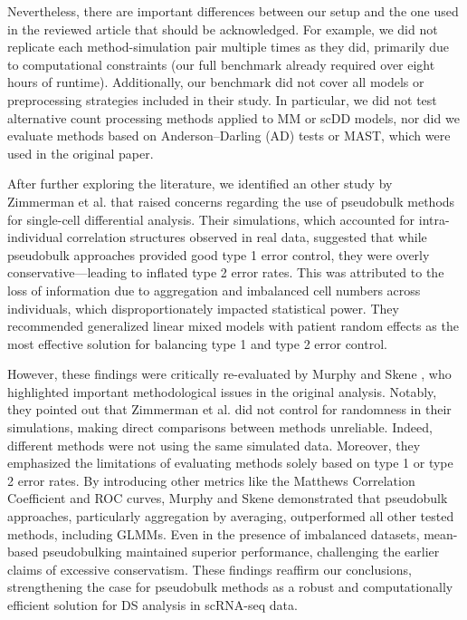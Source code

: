 \documentclass[a4paper, 11pt, twocolumn]{article}
\begin{document}
\begin{multicols}{2}
Nevertheless, there are important differences between our setup and the one used in the reviewed article that should be acknowledged. For example, we did not replicate each method-simulation pair multiple times as they did, primarily due to computational constraints (our full benchmark already required over eight hours of runtime). Additionally, our benchmark did not cover all models or preprocessing strategies included in their study. In particular, we did not test alternative count processing methods applied to MM or scDD models, nor did we evaluate methods based on Anderson–Darling (AD) tests or MAST, which were used in the original paper.

After further exploring the literature, we identified an other study by Zimmerman et al. \citep{zimmerman2021practical} that raised concerns regarding the use of pseudobulk methods for single-cell differential analysis. Their simulations, which accounted for intra-individual correlation structures observed in real data, suggested that while pseudobulk approaches provided good type 1 error control, they were overly conservative—leading to inflated type 2 error rates. This was attributed to the loss of information due to aggregation and imbalanced cell numbers across individuals, which disproportionately impacted statistical power. They recommended generalized linear mixed models  with patient random effects as the most effective solution for balancing type 1 and type 2 error control.

However, these findings were critically re-evaluated by Murphy and Skene \citep{murphy2022balanced}, who highlighted important methodological issues in the original analysis. Notably, they pointed out that Zimmerman et al. did not control for randomness in their simulations, making direct comparisons between methods unreliable. Indeed, different methods were not using the same simulated data. Moreover, they emphasized the limitations of evaluating methods solely based on type 1 or type 2 error rates. By introducing other metrics like the Matthews Correlation Coefficient and ROC curves, Murphy and Skene demonstrated that pseudobulk approaches, particularly aggregation by averaging, outperformed all other tested methods, including GLMMs. Even in the presence of imbalanced datasets, mean-based pseudobulking maintained superior performance, challenging the earlier claims of excessive conservatism. These findings reaffirm our conclusions, strengthening the case for pseudobulk methods as a robust and computationally efficient solution for DS analysis in scRNA-seq data.



\end{multicols}
\end{document}
